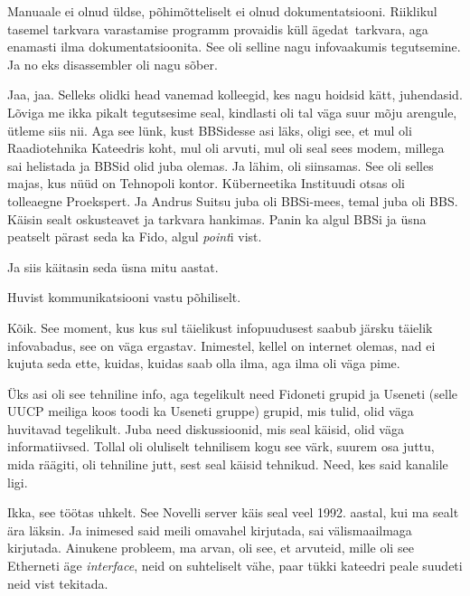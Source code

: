 Manuaale ei olnud üldse, põhimõtteliselt ei olnud dokumentatsiooni. Riiklikul tasemel tarkvara varastamise programm provaidis küll ägedat tarkvara, aga enamasti ilma dokumentatsioonita. See oli selline nagu  infovaakumis tegutsemine. Ja no eks disassembler oli nagu sõber.


Jaa, jaa. Selleks olidki head vanemad kolleegid, kes nagu hoidsid kätt, juhendasid. Lõviga me ikka pikalt tegutsesime seal, kindlasti oli tal väga suur mõju arengule, ütleme siis nii. Aga see lünk,  kust BBSidesse asi läks,  oligi see, et mul oli Raadiotehnika Kateedris koht, mul oli arvuti, mul oli seal sees modem, millega sai helistada ja BBSid olid juba olemas. Ja lähim, oli siinsamas. See oli selles majas, kus nüüd on Tehnopoli kontor. Küberneetika Instituudi otsas oli tolleaegne Proekspert. Ja Andrus Suitsu juba oli BBSi-mees, temal juba oli BBS. Käisin sealt oskusteavet ja tarkvara hankimas. Panin ka algul BBSi ja üsna peatselt pärast seda ka Fido, algul \emph{point}i vist.

Ja siis käitasin seda üsna mitu aastat. 


Huvist kommunikatsiooni vastu põhiliselt.


Kõik. See moment, kus kus sul täielikust infopuudusest saabub järsku täielik infovabadus, see on väga ergastav. Inimestel, kellel on internet olemas, nad ei kujuta seda ette, kuidas, kuidas saab olla ilma, aga ilma oli väga pime.

Üks asi oli see tehniline info, aga tegelikult need Fidoneti grupid ja Useneti (selle UUCP meiliga koos toodi ka Useneti gruppe) grupid, mis tulid, olid väga huvitavad tegelikult. Juba need diskussioonid, mis seal käisid, olid väga informatiivsed. Tollal oli oluliselt tehnilisem kogu see värk, suurem osa juttu, mida räägiti, oli tehniline jutt, sest seal käisid tehnikud. Need, kes said kanalile ligi.


Ikka, see töötas uhkelt. See Novelli server käis seal veel 1992. aastal, kui ma sealt ära läksin. Ja inimesed said meili omavahel kirjutada, sai välismaailmaga kirjutada. Ainukene probleem, ma arvan, oli see, et arvuteid, mille oli see Etherneti äge \emph{interface}, neid on suhteliselt vähe, paar tükki kateedri peale suudeti neid vist tekitada.

